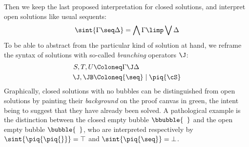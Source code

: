 Then we keep the last proposed interpretation for closed solutions, and
interpret open solutions like usual sequents:
$$\sint{\Gamma \seq \Delta} = \bigwedge{\Gamma} \limp \bigvee{\Delta}$$ To be
able to abstract from the particular kind of solution at hand, we reframe the
syntax of solutions with so-called \emph{branching} operators $\J$:
\begin{align*}
  S, T, U &\Coloneq \Gamma \J \Delta \\
  \J, \JB &\Coloneq {\seq} \mid \piq{\cS}
\end{align*}
Graphically, closed solutions with no bubbles can be distinguished from open
solutions by painting their \emph{background} on the proof canvas in green, the
intent being to suggest that they have already been solved. A pathological
example is the distinction between the closed empty bubble
$\bbubble{\phantom{a}}$ and the open empty bubble $\bubble{\phantom{a}}$, who
are interpreted respectively by $\sint{\piq{\piq{}}} = \top$ and
$\sint{\piq{\seq}} = \bot$.

